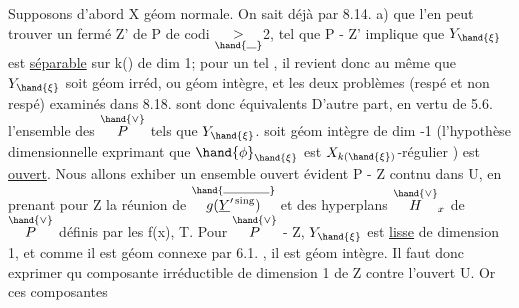 

Supposons d'abord X géom normale. On sait déjà par 8.14. a)  que
l'en  peut trouver un fermé Z' de P de codi $\underset{\hand{\rule{0.7em}{0.35pt}}}{>}$2, tel que
\hand{$\xi\in$} P - Z'  implique que  $Y_{\hand{\xi}}$  est  \uline{séparable} sur k(\hand{$\xi$}) de  dim 1; pour
un tel \hand{$\xi$} , il revient donc au même que $Y_{\hand{\xi}}$ soit géom irréd, ou géom
intègre, et  les deux problèmes  (respé et non respé) examinés dans
8.18. sont donc équivalents D'autre part, en vertu de 5.6. l'ensemble
 des \hand{$\xi\in$} $\overset{\hand{\vee}}{P}$  tels que  $Y_{\hand{\xi}}$.  soit géom intègre de dim -1 (l'hypothèse
dimensionnelle exprimant que $\hand{\phi}_{\hand{\xi}}$ est $X_{k(\hand{\xi})}$-régulier ) est \uline{ouvert}.
Nous allons exhiber un ensemble ouvert  évident  P - Z  contnu dans U,
en prenant pour  Z la réunion de  $\overset{\hand{\rule{3.3em}{0.35pt}}}{g(\underline{Y}'^{\,\mathrm{sing}})}$  et des hyperplans $\overset{\hand{\vee}}{H}_x$
de $\overset{\hand{\vee}}{P}$  définis par les  f(x),  T.  Pour \hand{$\xi\in$} $\overset{\hand{\vee}}{P}$ - Z,  $Y_{\hand{\xi}}$  est \uline{lisse}
de dimension 1, et comme il est géom connexe par 6.1. , il est géom
intègre.  Il faut donc  exprimer qu  composante irréductible
de dimension  1 de Z  contre l'ouvert U.  Or ces composantes
